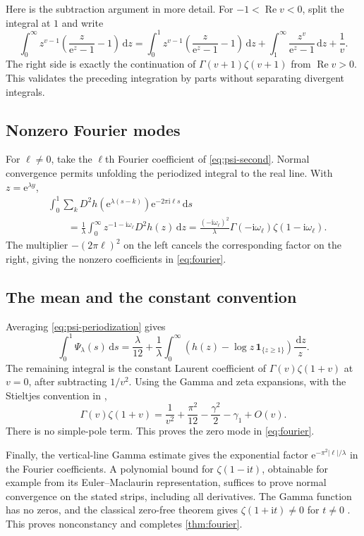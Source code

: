 \documentclass[11pt,a4paper]{article}
\numberwithin{equation}{section}
\theoremstyle{definition}
\newcommand{\dd}{\,\mathrm d}
\newcommand{\ii}{\mathrm i}
\newcommand{\ee}{\mathrm e}
\begin{document}
Here is the subtraction argument in more detail. For $-1<\operatorname{Re}v<0$, split the integral at $1$ and write
\[
 \int_0^\infty z^{v-1}\left(\frac z{\ee^z-1}-1\right)\dd z
 =\int_0^1z^{v-1}\left(\frac z{\ee^z-1}-1\right)\dd z
 +\int_1^\infty\frac{z^v}{\ee^z-1}\dd z+\frac1v.
\]
The right side is exactly the continuation of $\Gamma(v+1)\zeta(v+1)$ from $\operatorname{Re}v>0$. This validates the preceding integration by parts without separating divergent integrals.

\subsection{Nonzero Fourier modes}
For $\ell\ne0$, take the $\ell$th Fourier coefficient of \eqref{eq:psi-second}. Normal convergence permits unfolding the periodized integral to the real line. With $z=\ee^{\lambda y}$,
\begin{align*}
 &\int_0^1\sum_kD^2h(\ee^{\lambda(s-k)})
            \ee^{-2\pi\ii\ell s}\dd s\\
 &\qquad=\frac1\lambda\int_0^\infty
 z^{-1-\ii\omega_\ell}D^2h(z)\dd z
 =\frac{(-\ii\omega_\ell)^2}{\lambda}
   \Gamma(-\ii\omega_\ell)\zeta(1-\ii\omega_\ell).
\end{align*}
The multiplier $-(2\pi\ell)^2$ on the left cancels the corresponding factor on the right, giving the nonzero coefficients in \eqref{eq:fourier}.

\subsection{The mean and the constant convention}
Averaging \eqref{eq:psi-periodization} gives
\begin{equation}
 \int_0^1\Psi_\lambda(s)\dd s
 =\frac\lambda{12}+\frac1\lambda
 \int_0^\infty\left(h(z)-\log z\,\mathbf1_{\{z\geq1\}}\right)\frac{\dd z}{z}.
 \label{eq:mean-integral}
\end{equation}
The remaining integral is the constant Laurent coefficient of
$\Gamma(v)\zeta(1+v)$ at $v=0$, after subtracting $1/v^2$.
Using the Gamma and zeta expansions, with the Stieltjes convention in \cite[\S25.2]{dlmf},
\[
 \Gamma(v)\zeta(1+v)
 =\frac1{v^2}+\frac{\pi^2}{12}-\frac{\gamma^2}{2}-\gamma_1+O(v).
\]
There is no simple-pole term. This proves the zero mode in \eqref{eq:fourier}.

Finally, the vertical-line Gamma estimate \cite[\S5.11]{dlmf} gives the exponential factor $\ee^{-\pi^2|\ell|/\lambda}$ in the Fourier coefficients. A polynomial bound for $\zeta(1-\ii t)$, obtainable for example from its Euler--Maclaurin representation, suffices to prove normal convergence on the stated strips, including all derivatives. The Gamma function has no zeros, and the classical zero-free theorem gives $\zeta(1+\ii t)\ne0$ for $t\ne0$ \cite[\S25.10]{dlmf}. This proves nonconstancy and completes \cref{thm:fourier}.
\end{document}
